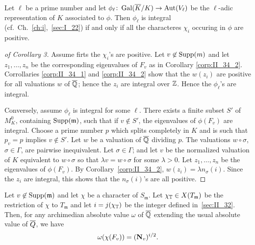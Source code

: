 \begin{corp}\label{corp:II_34_3}
Let $\ell$ be a prime number and let $\phi_\ell \colon \operatorname{Gal}(\overline{K}
/K) \rightarrow \operatorname{Aut}(V_\ell)$ be the $\ell$-adic representation of $K$ 
associated to $\phi$. Then $\phi_\ell$ is integral (cf.\ Ch.~\ref{ch:i},~\ref{sec:I_22}) if
and only if all the characteres $\chi_i$ occuring in $\phi$ are positive.
\end{corp}

\begin{proof}[ of Corollary 3]
Assume firts the $\chi_i$'s are positive. Let $v \not\in \operatorname{Supp}(m)$ and let
$z_1,\dots,z_n$ be the corresponding eigenvalues of
\dpage
$F_v$ as in Corollary \ref{corp:II_34_2}. Corrollaries \ref{corp:II_34_1} and 
\ref{corp:II_34_2} show that the $w(z_i)$ are positive for all valuations $w$
of $\overline{\mathbb{Q}}$; hence the $z_i$ are integral over $\mathbb{Z}$. Hence the $\phi_\ell$'s
are integral.

Conversely, assume $\phi_\ell$ is integral for some $\ell$. There exists a 
finite subset $S'$ of $M_K^0$, containing $\operatorname{Supp}(\mathfrak{m})$, such that if
$v \not\in S'$, the eigenvalues of $\phi(F_v)$ are integral. Choose a prime
number $p$ which splits completely in $K$ and is such that $p_v = p$ implies
$v \not\in S'$. Let $w$ be a valuation of $\overline{\mathbb{Q}}$ dividing $p$. The
valuations $w \circ \sigma$, $\sigma \in \Gamma$, are pairwise inequivalent.
Let $\sigma \in \Gamma$; and let $v$ be the normalized valuation of $K$ 
equivalent to $w \circ \sigma$ so that $\lambda v = w \circ \sigma$ for some
$\lambda > 0$. Let $z_1,\dots,z_n$ be the eigenvalues of $\phi(F_v)$. By
Corollary~\ref{corp:II_34_2}, $w(z_i) = \lambda n_\sigma (i)$. Since the $z_i$ 
are integral, this shows that the $n_\sigma(i)$'s are all positive.
\end{proof}

\begin{prop}\label{prop:II_34_2}
Let $v \not\in \operatorname{Supp}(\mathfrak{m})$ and let $\chi$ be a character of
$S_{\mathfrak{m}}$. Let $\chi_{\mathbb{T}} \in X(T_{\mathfrak{m}})$ be the restriction
of $\chi$ to $T_{\mathfrak{m}}$ and let $i = j(\chi_{\mathbb{T}})$ be the integer
defined in~\ref{sec:II_32}.  Then, for any archimedian absolute value $\omega$
of $\overline{\mathbb{Q}}$ extending the usual absolute value of $\overline{Q}$, we have
\[
	\omega(\chi (F_v)) = (\operatorname{\mathbf{N}}_v)^{i/2}.
\]
\end{prop}

